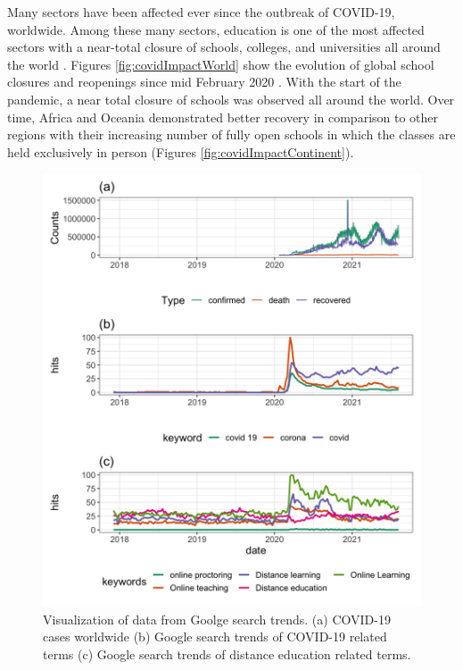 \documentclass[11pt,a4paper,]{article}
\begin{document}
Many sectors have been affected ever since the outbreak of COVID-19, worldwide. Among these many sectors, education is one of the most affected sectors with a near-total closure of schools, colleges, and universities all around the world \autocite{daniel2020education}. Figures \ref{fig:covidImpactWorld} show the evolution of global school closures and reopenings since mid February 2020 \autocite{unesco2020covid}. With the start of the pandemic, a near total closure of schools was observed all around the world. Over time, Africa and Oceania demonstrated better recovery in comparison to other regions with their increasing number of fully open schools in which the classes are held exclusively in person (Figures \ref{fig:covidImpactContinent}).

\begin{figure}[h]

{\centering \includegraphics[width=1\textwidth]{figure/distanceLearningWorldAnalysis-1} 

}

\caption{Visualization of data from Goolge search trends. (a) COVID-19 cases worldwide (b) Google search trends of COVID-19 related terms (c) Google search trends of distance education related terms.}\label{fig:distanceLearningWorldAnalysis}
\end{figure}
\end{document}
